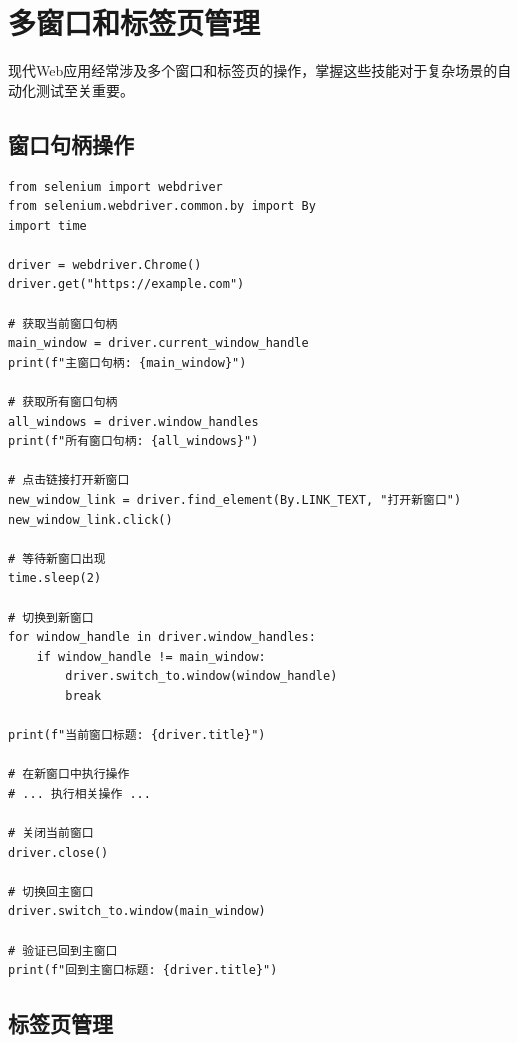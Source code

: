 \section{多窗口和标签页管理}

现代Web应用经常涉及多个窗口和标签页的操作，掌握这些技能对于复杂场景的自动化测试至关重要。

\subsection{窗口句柄操作}

\begin{lstlisting}[style=demostyle,numbers=none]
from selenium import webdriver
from selenium.webdriver.common.by import By
import time

driver = webdriver.Chrome()
driver.get("https://example.com")

# 获取当前窗口句柄
main_window = driver.current_window_handle
print(f"主窗口句柄: {main_window}")

# 获取所有窗口句柄
all_windows = driver.window_handles
print(f"所有窗口句柄: {all_windows}")

# 点击链接打开新窗口
new_window_link = driver.find_element(By.LINK_TEXT, "打开新窗口")
new_window_link.click()

# 等待新窗口出现
time.sleep(2)

# 切换到新窗口
for window_handle in driver.window_handles:
    if window_handle != main_window:
        driver.switch_to.window(window_handle)
        break

print(f"当前窗口标题: {driver.title}")

# 在新窗口中执行操作
# ... 执行相关操作 ...

# 关闭当前窗口
driver.close()

# 切换回主窗口
driver.switch_to.window(main_window)

# 验证已回到主窗口
print(f"回到主窗口标题: {driver.title}")
\end{lstlisting}

\subsection{标签页管理}

